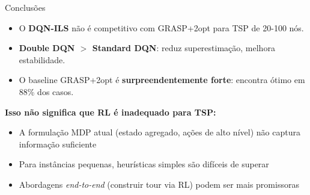 \documentclass[11pt, xcolor=dvipsnames]{beamer}
\newcommand{\destaque}[1]{\textbf{\textcolor{verde}{#1}}}
\begin{document}
\begin{frame}{Conclusões}
  \footnotesize
  \begin{itemize}
    \item O \destaque{DQN-ILS} não é competitivo com GRASP+2opt para TSP de 20-100 nós.
    \item \destaque{Double DQN $>$ Standard DQN}: reduz superestimação, melhora estabilidade.
    \item O baseline GRASP+2opt é \destaque{surpreendentemente forte}: encontra ótimo em 88\% dos casos.
  \end{itemize}
  \vspace{3mm}
  \begin{calloutbox}
    {\footnotesize
    \textbf{Isso não significa que RL é inadequado para TSP:}
    \begin{itemize}
      \item A formulação MDP atual (estado agregado, ações de alto nível) não captura informação suficiente
      \item Para instâncias pequenas, heurísticas simples são difíceis de superar
      \item Abordagens \emph{end-to-end} (construir tour via RL) podem ser mais promissoras
    \end{itemize}
    }
  \end{calloutbox}
\end{frame}
\end{document}
